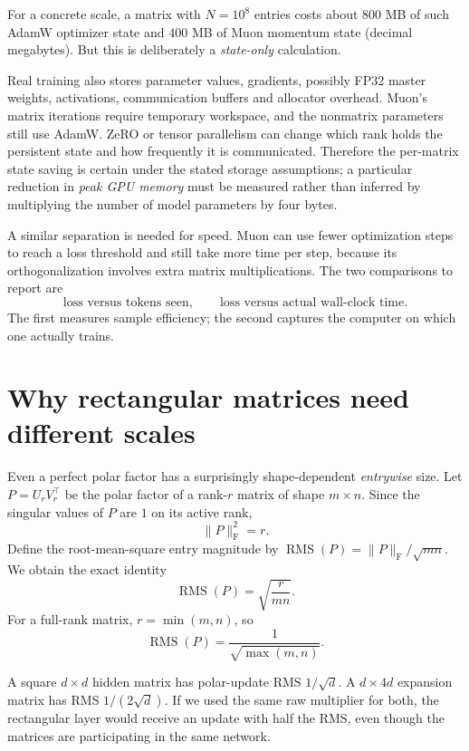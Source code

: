 For a concrete scale, a matrix with \(N=10^8\) entries costs about \(800\) MB of such AdamW optimizer state and \(400\) MB of Muon momentum state (decimal megabytes).  But this is deliberately a \emph{state-only} calculation.

Real training also stores parameter values, gradients, possibly FP32 master weights, activations, communication buffers and allocator overhead.  Muon's matrix iterations require temporary workspace, and the nonmatrix parameters still use AdamW.  ZeRO or tensor parallelism can change which rank holds the persistent state and how frequently it is communicated.  Therefore the per-matrix state saving is certain under the stated storage assumptions; a particular reduction in \emph{peak GPU memory} must be measured rather than inferred by multiplying the number of model parameters by four bytes.

A similar separation is needed for speed.  Muon can use fewer optimization steps to reach a loss threshold and still take more time per step, because its orthogonalization involves extra matrix multiplications.  The two comparisons to report are
\[
 \text{loss versus tokens seen},
 \qquad
 \text{loss versus actual wall-clock time}.
\]
The first measures sample efficiency; the second captures the computer on which one actually trains.

\section{Why rectangular matrices need different scales}

Even a perfect polar factor has a surprisingly shape-dependent \emph{entrywise} size.  Let \(P=U_rV_r^\top\) be the polar factor of a rank-\(r\) matrix of shape \(m\times n\).  Since the singular values of \(P\) are \(1\) on its active rank,
\[
 \|P\|_{\mathrm F}^2=r.
\]
Define the root-mean-square entry magnitude by
\(
 \operatorname{RMS}(P)=\|P\|_{\mathrm F}/\sqrt{mn}.
\)
We obtain the exact identity
\begin{equation}
 \operatorname{RMS}(P)=\sqrt{\frac{r}{mn}}.
 \label{eq:N20261017-polar-rms}
\end{equation}
For a full-rank matrix, \(r=\min(m,n)\), so
\begin{equation}
 \operatorname{RMS}(P)=\frac{1}{\sqrt{\max(m,n)}}.
 \label{eq:N20261017-full-rank-rms}
\end{equation}

A square \(d\times d\) hidden matrix has polar-update RMS \(1/\sqrt d\).  A \(d\times4d\) expansion matrix has RMS \(1/(2\sqrt d)\).  If we used the same raw multiplier for both, the rectangular layer would receive an update with half the RMS, even though the matrices are participating in the same network.

